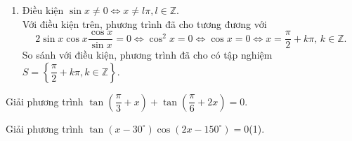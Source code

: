 \begin{ex}
{\begin{enumerate}
			\[\tan 4x=\dfrac{1}{\cot 2x} \Leftrightarrow 4x=2x+k\pi \Leftrightarrow x=k\dfrac{\pi}{2},\,  k\in \mathbb{Z}.
			\] 
			So sánh với điều kiện, phương trình đã  cho vô nghiệm.
			\item Điều kiện $\sin  x\ne 0\Leftrightarrow x\ne l\pi, l\in \mathbb{Z}$.\\
			Với điều kiện trên, phương trình đã cho tương đương với 
			\[2\sin  x\cos x\dfrac{\cos x}{\sin x}=0\Leftrightarrow \cos^2x=0\Leftrightarrow \cos x=0\Leftrightarrow x=\dfrac{\pi}{2}+k\pi,\, k\in \mathbb{Z}.
			 \]
			So  sánh với điều kiện, phương trình đã cho có tập nghiệm $S=\left\{\dfrac{\pi}{2}+k\pi, k\in \mathbb{Z}\right\}$.
		\end{enumerate}
	} 
\end{ex}

\begin{ex}%
	Giải phương trình $\tan  \left(\dfrac{\pi}{3}+x\right)+\tan \left(\dfrac{\pi}{6}+2x\right)=0$.
\end{ex}

\begin{ex}%
	Giải phương trình $\tan \left(x-30^\circ \right)\cos \left(2x-150^\circ  \right)=0$\quad (1).
\end{ex}

